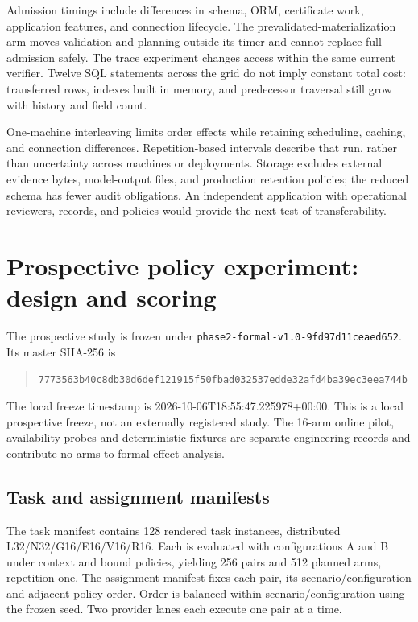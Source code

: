 \documentclass[11pt,a4paper]{article}
\newcommand{\code}[1]{\nolinkurl{#1}}
\begin{document}
Admission timings include differences in schema, ORM, certificate work, application features, and connection lifecycle. The prevalidated-materialization arm moves validation and planning outside its timer and cannot replace full admission safely. The trace experiment changes access within the same current verifier. Twelve SQL statements across the grid do not imply constant total cost: transferred rows, indexes built in memory, and predecessor traversal still grow with history and field count.

One-machine interleaving limits order effects while retaining scheduling, caching, and connection differences. Repetition-based intervals describe that run, rather than uncertainty across machines or deployments. Storage excludes external evidence bytes, model-output files, and production retention policies; the reduced schema has fewer audit obligations. An independent application with operational reviewers, records, and policies would provide the next test of transferability.


\section{Prospective policy experiment: design and scoring}
\label{app:phase2-design}
The prospective study is frozen under \code{phase2-formal-v1.0-9fd97d11ceaed652}. Its master SHA-256 is
\begin{quote}\footnotesize\code{7773563b40c8db30d6def121915f50fbad032537edde32afd4ba39ec3eea744b}\end{quote}
The local freeze timestamp is 2026-10-06T18:55:47.225978+00:00. This is a local prospective freeze, not an externally registered study. The 16-arm online pilot, availability probes and deterministic fixtures are separate engineering records and contribute no arms to formal effect analysis.

\subsection{Task and assignment manifests}
The task manifest contains 128 rendered task instances, distributed L32/N32/G16/E16/V16/R16. Each is evaluated with configurations A and B under context and bound policies, yielding 256 pairs and 512 planned arms, repetition one. The assignment manifest fixes each pair, its scenario/configuration and adjacent policy order. Order is balanced within scenario/configuration using the frozen seed. Two provider lanes each execute one pair at a time.
\end{document}
